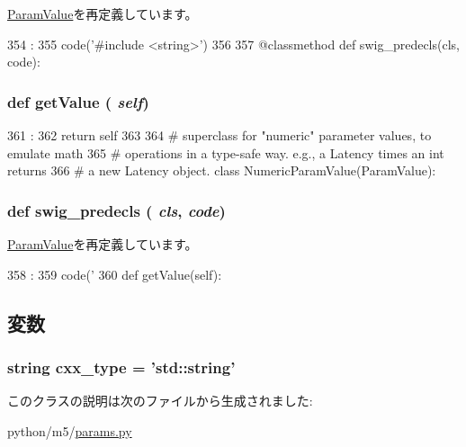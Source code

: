 \hyperlink{classm5_1_1params_1_1ParamValue_a0b408a11a14bd1d770e28f71a6e14ab5}{ParamValue}を再定義しています。


\begin{DoxyCode}
354                                 :
355         code('#include <string>')
356 
357     @classmethod
    def swig_predecls(cls, code):
\end{DoxyCode}
\hypertarget{classm5_1_1params_1_1String_acc340fbd4335fa34f9d57fb454b28ed0}{
\subsubsection[{getValue}]{\setlength{\rightskip}{0pt plus 5cm}def getValue ( {\em self})}}
\label{classm5_1_1params_1_1String_acc340fbd4335fa34f9d57fb454b28ed0}



\begin{DoxyCode}
361                       :
362         return self
363 
364 # superclass for "numeric" parameter values, to emulate math
365 # operations in a type-safe way.  e.g., a Latency times an int returns
366 # a new Latency object.
class NumericParamValue(ParamValue):
\end{DoxyCode}
\hypertarget{classm5_1_1params_1_1String_ab3dbcf5716623eac67a8ccc074fa7e13}{
\subsubsection[{swig\_\-predecls}]{\setlength{\rightskip}{0pt plus 5cm}def swig\_\-predecls ( {\em cls}, \/   {\em code})}}
\label{classm5_1_1params_1_1String_ab3dbcf5716623eac67a8ccc074fa7e13}


\hyperlink{classm5_1_1params_1_1ParamValue_ab3dbcf5716623eac67a8ccc074fa7e13}{ParamValue}を再定義しています。


\begin{DoxyCode}
358                                 :
359         code('%
360 
    def getValue(self):
\end{DoxyCode}


\subsection{変数}
\hypertarget{classm5_1_1params_1_1String_a2f1553ebb79374a68b36fdd6d8d82fc3}{
\subsubsection[{cxx\_\-type}]{\setlength{\rightskip}{0pt plus 5cm}string {\bf cxx\_\-type} = 'std::string'}}
\label{classm5_1_1params_1_1String_a2f1553ebb79374a68b36fdd6d8d82fc3}


このクラスの説明は次のファイルから生成されました:\begin{DoxyCompactItemize}
\item 
python/m5/\hyperlink{params_8py}{params.py}\end{DoxyCompactItemize}
